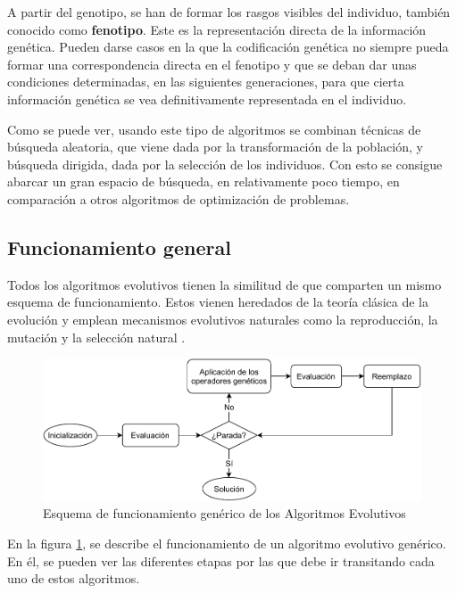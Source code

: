 A partir del genotipo, se han de formar los rasgos visibles del individuo, también conocido como \textbf{fenotipo}. Este es la representación directa de la información genética. Pueden darse casos en la que la codificación genética no siempre pueda formar una correspondencia directa en el fenotipo y que se deban dar unas condiciones determinadas, en las siguientes generaciones, para que cierta información genética se vea definitivamente representada en el individuo.

Como se puede ver, usando este tipo de algoritmos se combinan técnicas de búsqueda aleatoria, que viene dada por la transformación de la población, y búsqueda dirigida, dada por la selección de los individuos. Con esto se consigue abarcar un gran espacio de búsqueda, en relativamente poco tiempo, en comparación a otros algoritmos de optimización de problemas.

\subsection{Funcionamiento general}

Todos los algoritmos evolutivos tienen la similitud de que comparten un mismo esquema de funcionamiento. Estos vienen heredados de la teoría clásica de la evolución y emplean mecanismos evolutivos naturales como la reproducción, la mutación y la selección natural \cite{10.5555/2432058}.

\begin{figure}[h]
    \centering
    \includegraphics[width=\textwidth]{figuras/desarrollo teorico/Algoritmo_Evolutivo.pdf}
    \caption{Esquema de funcionamiento genérico de los Algoritmos Evolutivos}
    \label{fig:diagrama_alg_evolutivo}
\end{figure}

En la figura \ref{fig:diagrama_alg_evolutivo}, se describe el funcionamiento de un algoritmo evolutivo genérico. En él, se pueden ver las diferentes etapas por las que debe ir transitando cada uno de estos algoritmos.

